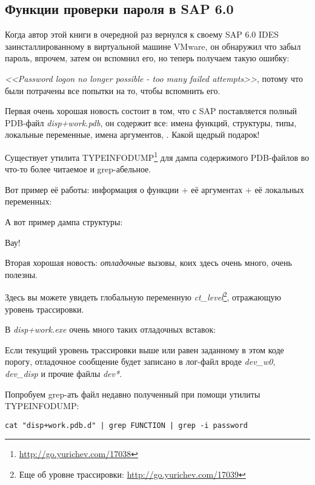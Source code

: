 \subsection{Функции проверки пароля в SAP 6.0}

Когда автор этой книги в очередной раз вернулся к своему SAP 6.0 IDES заинсталлированному в виртуальной машине VMware, он обнаружил что забыл пароль, впрочем, затем он вспомнил его, но теперь получаем такую ошибку:
 
\emph{<<Password logon no longer possible - too many failed attempts>>}, 
потому что были потрачены все попытки на то, чтобы вспомнить его.

Первая очень хорошая новость состоит в том, что с SAP поставляется полный \gls{PDB}-файл \emph{disp+work.pdb}, он содержит все: имена функций, структуры, типы, локальные переменные, имена аргументов, \etc{}. Какой щедрый подарок!

Существует утилита TYPEINFODUMP\footnote{\url{http://go.yurichev.com/17038}} для дампа содержимого \gls{PDB}-файлов во что-то более читаемое и grep-абельное.

Вот пример её работы: информация о функции + её аргументах + её локальных переменных:



А вот пример дампа структуры:



Вау!

Вторая хорошая новость: \emph{отладочные} вызовы, коих здесь очень много, очень полезны. 

Здесь вы можете увидеть глобальную переменную \emph{ct\_level}\footnote{Еще об уровне трассировки: \url{http://go.yurichev.com/17039}}, отражающую уровень трассировки.

В \emph{disp+work.exe} очень много таких отладочных вставок:



Если текущий уровень трассировки выше или равен заданному в этом коде порогу, 
отладочное сообщение будет записано в лог-файл вроде \emph{dev\_w0}, \emph{dev\_disp} 
и прочие файлы \emph{dev*}.

\myindex{\GrepUsage}
Попробуем grep-ать файл недавно полученный при помощи утилиты TYPEINFODUMP:

\begin{lstlisting}
cat "disp+work.pdb.d" | grep FUNCTION | grep -i password
\end{lstlisting}

